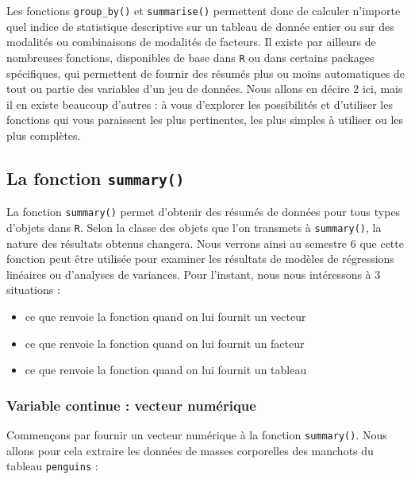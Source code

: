 \documentclass[
  a4paper,
  DIV=11,
  numbers=noendperiod,
  oneside]{scrreprt}
\providecommand{\tightlist}{%
  \setlength{\itemsep}{0pt}\setlength{\parskip}{0pt}}\usepackage{longtable,booktabs,array}
\begin{document}
Les fonctions \texttt{group\_by()} et \texttt{summarise()} permettent
donc de calculer n'importe quel indice de statistique descriptive sur un
tableau de donnée entier ou sur des modalités ou combinaisons de
modalités de facteurs. Il existe par ailleurs de nombreuses fonctions,
disponibles de base dans \texttt{R} ou dans certains packages
spécifiques, qui permettent de fournir des résumés plus ou moins
automatiques de tout ou partie des variables d'un jeu de données. Nous
allons en décire 2 ici, mais il en existe beaucoup d'autres : à vous
d'explorer les possibilités et d'utiliser les fonctions qui vous
paraissent les plus pertinentes, les plus simples à utiliser ou les plus
complètes.

\hypertarget{la-fonction-summary}{%
\subsection{\texorpdfstring{La fonction
\texttt{summary()}}{La fonction summary()}}\label{la-fonction-summary}}

La fonction \texttt{summary()} permet d'obtenir des résumés de données
pour tous types d'objets dans \texttt{R}. Selon la classe des objets que
l'on transmets à \texttt{summary()}, la nature des résultats obtenus
changera. Nous verrons ainsi au semestre 6 que cette fonction peut être
utilisée pour examiner les résultats de modèles de régressions linéaires
ou d'analyses de variances. Pour l'instant, nous nous intéressons à 3
situations :

\begin{itemize}
\tightlist
\item
  ce que renvoie la fonction quand on lui fournit un vecteur
\item
  ce que renvoie la fonction quand on lui fournit un facteur
\item
  ce que renvoie la fonction quand on lui fournit un tableau
\end{itemize}

\hypertarget{variable-continue-vecteur-numuxe9rique}{%
\subsubsection{Variable continue : vecteur
numérique}\label{variable-continue-vecteur-numuxe9rique}}

Commençons par fournir un vecteur numérique à la fonction
\texttt{summary()}. Nous allons pour cela extraire les données de masses
corporelles des manchots du tableau \texttt{penguins} :
\end{document}
